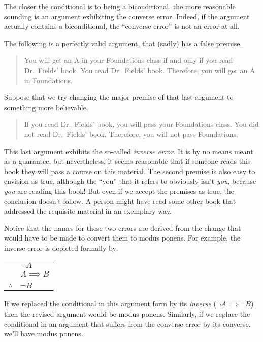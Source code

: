 \documentclass[10pt,]{book}
\theoremstyle{plain}
\theoremstyle{definition}
\theoremstyle{definition}
\numberwithin{equation}{section}
\newcommand{\hrulethin}  {\noalign{\hrule height 0.04em}}
\begin{document}
    The closer the conditional is to being a biconditional, the more reasonable
    sounding is an argument exhibiting the converse error. Indeed, if the
    argument actually contains a biconditional, the ``converse error'' is not
    an error at all.
\par

    The following is a perfectly valid argument, that (sadly) has a false premise.
\begin{quote}
  You will get an A in your Foundations class if and only if you 
  read Dr.~Fields' book.
  You read Dr.~Fields' book. 
  Therefore, you will get an A in Foundations.
  \end{quote}
\par

    Suppose that we try changing the major premise of that last argument to
    something more believable.
\begin{quote}
  If you read Dr.~Fields' book, you will pass your Foundations class. 
  You did not read Dr.~Fields' book. 
  Therefore, you will not pass Foundations.
  \end{quote}
\par

    This last argument exhibits the so-called \emph{inverse error}. It is by
    no means meant as a guarantee, but nevertheless, it seems reasonable that
    if someone reads this book they will pass a course on this material.
    The second premise is also easy to envision as true, although the
    ``you'' that it refers to obviously isn't \emph{you}, because \emph{you}
    are reading this book! But even if we accept the premises as true, the
    conclusion doesn't follow. A person might have read some other book that
    addressed the requisite material in an exemplary way.
\par

    Notice that the names for these two errors are derived from the change
    that would have to be made to convert them to modus ponens. For example,
    the inverse error is depicted formally by:
\begin{tabular}{ll}
&\({\lnot}A\)\tabularnewline[0pt]
&\(A \implies B\)\tabularnewline[0pt]
&\tabularnewline\hrulethin
\(\therefore\)&\({\lnot}B\)
\end{tabular}
\par

    If we replaced the conditional in this argument form by its \emph{inverse}
    (\({\lnot}A \implies {\lnot}B\)) then the revised argument would be
    modus ponens. Similarly, if we replace the conditional in an
    argument that suffers from the converse error by its converse,
    we'll have modus ponens.
\typeout{************************************************}
\typeout{************************************************}
\end{document}
